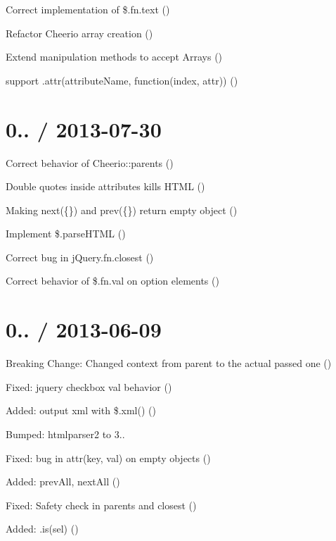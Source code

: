 \begin{DoxyItemize}
\item Correct implementation of {\ttfamily \$.fn.\+text} ()
\item Refactor Cheerio array creation ()
\item Extend manipulation methods to accept Arrays ()
\item support .attr(attribute\+Name, function(index, attr)) ()
\end{DoxyItemize}

\section*{0.. / 2013-\/07-\/30 }


\begin{DoxyItemize}
\item Correct behavior of {\ttfamily Cheerio\+::parents} ()
\item Double quotes inside attributes kills H\+T\+ML ()
\item Making next(\{\}) and prev(\{\}) return empty object ()
\item Implement \$.parse\+H\+T\+ML ()
\item Correct bug in j\+Query.\+fn.\+closest ()
\item Correct behavior of \$.fn.\+val on \textquotesingle{}option\textquotesingle{} elements ()
\end{DoxyItemize}

\section*{0.. / 2013-\/06-\/09 }


\begin{DoxyItemize}
\item Breaking Change\+: Changed context from parent to the actual passed one ()
\item Fixed\+: jquery checkbox val behavior ()
\item Added\+: output xml with \$.xml() ()
\item Bumped\+: htmlparser2 to 3..
\item Fixed\+: bug in attr(key, val) on empty objects ()
\item Added\+: prev\+All, next\+All ()
\item Fixed\+: Safety check in parents and closest ()
\item Added\+: .is(sel) ()
\end{DoxyItemize}

